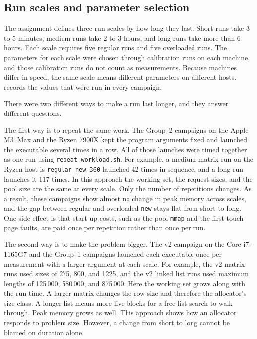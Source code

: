\subsection{Run scales and parameter selection}

The assignment defines three run scales by how long they last.
Short runs take 3 to 5 minutes, medium runs take 2 to 3 hours, and long runs
take more than 6 hours.
Each scale requires five regular runs and five overloaded runs.
The parameters for each scale were chosen through calibration runs on each
machine, and those calibration runs do not count as measurements.
Because machines differ in speed, the same scale means different parameters on
different hosts.
 records the values that were run in every
campaign.

There were two different ways to make a run last longer, and they answer
different questions.

The first way is to repeat the same work.
The Group~2 campaigns on the Apple M3~Max and the Ryzen 7900X kept the program
arguments fixed and launched the executable several times in a row.
All of those launches were timed together as one run using
\texttt{repeat\allowbreak\_workload.sh}.
For example, a medium matrix run on the Ryzen host is \texttt{regular\_new 360}
launched 42 times in sequence, and a long run launches it 117 times.
In this approach the working set, the request sizes, and the pool size are the
same at every scale.
Only the number of repetitions changes.
As a result, these campaigns show almost no change in peak memory across
scales, and the gap between regular and overloaded \texttt{new} stays flat from
short to long.
One side effect is that start-up costs, such as the pool \texttt{mmap} and the
first-touch page faults, are paid once per repetition rather than once per
run.

The second way is to make the problem bigger.
The v2 campaign on the Core i7-1165G7 and the Group~1 campaigns launched each
executable once per measurement with a larger argument at each scale.
For example, the v2 matrix runs used sizes of 275, 800, and 1225, and the v2
linked list runs used maximum lengths of 125\,000, 580\,000, and 875\,000.
Here the working set grows along with the run time.
A larger matrix changes the row size and therefore the allocator's size class.
A longer list means more live blocks for a free-list search to walk through.
Peak memory grows as well.
This approach shows how an allocator responds to problem size.
However, a change from short to long cannot be blamed on duration alone.

